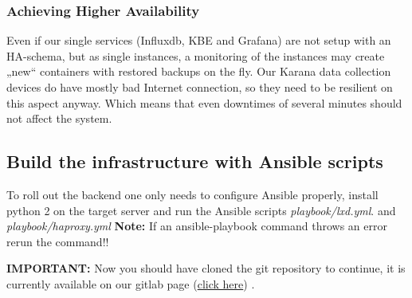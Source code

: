 \subsubsection{Achieving Higher Availability}
Even if our single services (Influxdb, KBE and Grafana) are not setup with an HA-schema, but as single instances, a monitoring of the instances may create „new“ containers with restored backups on the fly. Our Karana data collection devices do have mostly bad Internet connection, so they need to be resilient on this aspect anyway. Which means that even downtimes of several minutes should not affect the system.

\subsection{Build the infrastructure with Ansible scripts}
To roll out the backend one only needs to configure Ansible properly, install python 2 on the target server and run the Ansible scripts \textit{playbook/lxd.yml}. and \textit{playbook/haproxy.yml}
\textbf{Note:} If an ansible-playbook command throws an error rerun the command!!

\textbf{IMPORTANT:} Now you should have cloned the git repository to continue, it is currently available on our gitlab page (\href{ssh://git@gitlab.me-soldesign.com:222/karana/backend-deploy.git}{click here}) .
